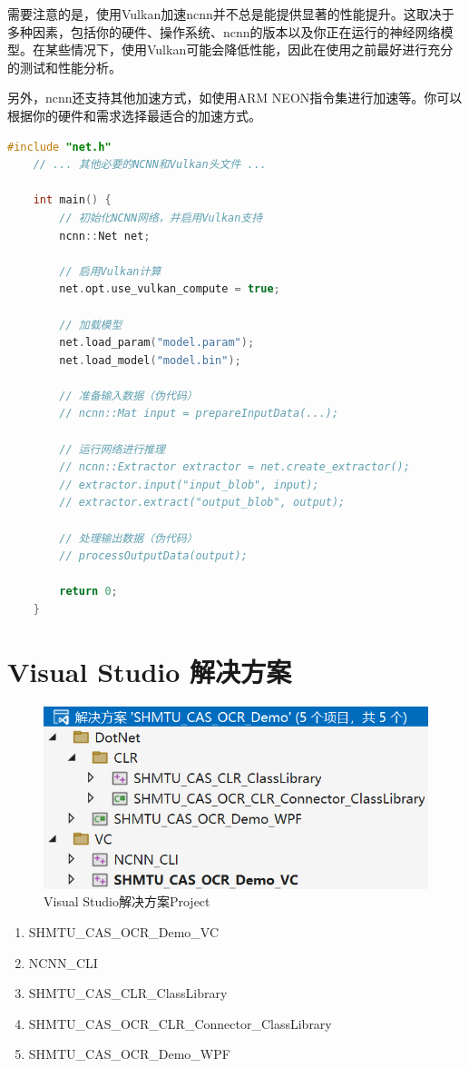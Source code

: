 需要注意的是，使用Vulkan加速ncnn并不总是能提供显著的性能提升。这取决于多种因素，包括你的硬件、操作系统、ncnn的版本以及你正在运行的神经网络模型。在某些情况下，使用Vulkan可能会降低性能，因此在使用之前最好进行充分的测试和性能分析。

另外，ncnn还支持其他加速方式，如使用ARM NEON指令集进行加速等。你可以根据你的硬件和需求选择最适合的加速方式。

\begin{lstlisting}[caption={NCNN with Vulkan Initialization}, language=C++]
	#include "net.h"
	// ... 其他必要的NCNN和Vulkan头文件 ...

	int main() {
		// 初始化NCNN网络，并启用Vulkan支持
		ncnn::Net net;

		// 启用Vulkan计算
		net.opt.use_vulkan_compute = true;

		// 加载模型
		net.load_param("model.param");
		net.load_model("model.bin");

		// 准备输入数据（伪代码）
		// ncnn::Mat input = prepareInputData(...);

		// 运行网络进行推理
		// ncnn::Extractor extractor = net.create_extractor();
		// extractor.input("input_blob", input);
		// extractor.extract("output_blob", output);

		// 处理输出数据（伪代码）
		// processOutputData(output);

		return 0;
	}
\end{lstlisting}

\section{Visual Studio 解决方案}

\begin{figure}
	\centering
	\includegraphics[width=0.7\linewidth]{Resources/Picture/Deploy/Windows/vs}
	\caption{Visual Studio解决方案Project}
	\label{fig:vs}
\end{figure}

\begin{enumerate}
	\item SHMTU\_CAS\_OCR\_Demo\_VC
	\item NCNN\_CLI
	\item SHMTU\_CAS\_CLR\_ClassLibrary
	\item SHMTU\_CAS\_OCR\_CLR\_Connector\_ClassLibrary
	\item SHMTU\_CAS\_OCR\_Demo\_WPF
\end{enumerate}

